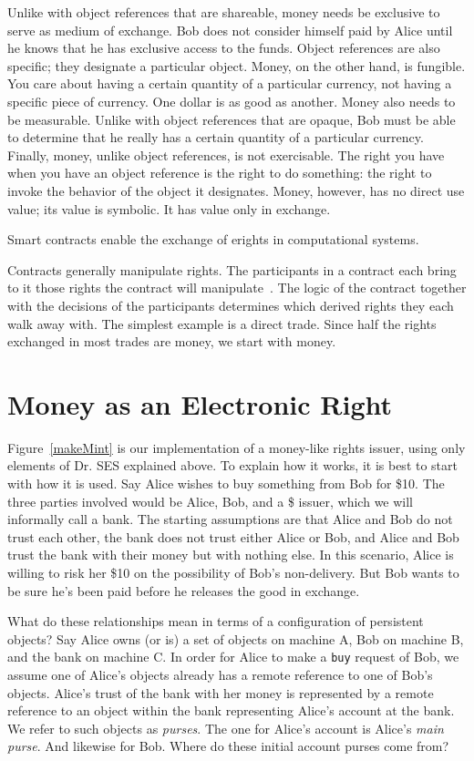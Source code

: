 \documentclass{llncs}
\begin{document}
Unlike with object references that are shareable, money needs be exclusive to serve as medium of exchange. Bob does not consider himself paid by Alice until he knows that he has exclusive access to the funds. Object references are also specific; they designate a particular object. Money, on the other hand, is fungible. You care about having a certain quantity of a particular currency, not having a specific piece of currency. One dollar is as good as another. Money also needs to be measurable. Unlike with object references that are opaque, Bob must be able to determine that he really has a certain quantity of a particular currency. Finally, money, unlike object references, is not exercisable. The right you have when you have an object reference is the right to do something: the right to invoke the behavior of the object it designates. Money, however, has no direct use value; its value is symbolic. It has value only in exchange.

Smart contracts enable the exchange of erights in computational systems. 

Contracts generally manipulate rights. The participants in a contract each bring to it those rights the contract will manipulate~\cite{barnett_consent_1986}. The logic of the contract together with the decisions of the participants determines which derived rights they each walk away with. The simplest example is a direct trade. Since half the rights exchanged in most trades are money, we start with money.


\section{Money as an Electronic Right}

Figure~\ref{makeMint}  is our implementation of a money-like rights issuer, using only elements of Dr. SES explained above. To explain how it works, it is best to start with how it is used. Say Alice wishes to buy something from Bob for \$10. The three parties involved would be Alice, Bob, and a \$ issuer, which we will informally call a bank. The starting assumptions are that Alice and Bob do not trust each other, the bank does not trust either Alice or Bob, and Alice and Bob trust the bank with their money but with nothing else. In this scenario, Alice is willing to risk her \$10 on the possibility of Bob's non-delivery. But Bob wants to be sure he's been paid before he releases the good in exchange.

What do these relationships mean in terms of a configuration of persistent objects? Say Alice owns (or is) a set of objects on machine A, Bob on machine B, and the bank on machine C. In order for Alice to make a {\tt buy} request of Bob, we assume one of Alice's objects already has a remote reference to one of Bob's objects. Alice's trust of the bank with her money is represented by a remote reference to an object within the bank representing Alice's account at the bank. We refer to such objects as \emph{purses}. The one for Alice's account is Alice's \emph{main purse}. And likewise for Bob. Where do these initial account purses come from?
\end{document}
